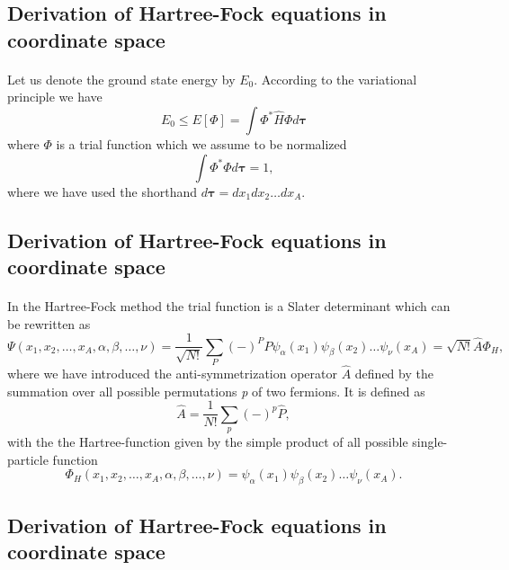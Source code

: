 \documentclass[%
twoside,                 %
final,                   %
10pt]{article}
\begin{document}
\subsection{Derivation of Hartree-Fock equations in coordinate space}

\paragraph{}
Let us denote the ground state energy by $E_0$. According to the
variational principle we have
\[
  E_0 \le E[\Phi] = \int \Phi^*\hat{H}\Phi d\mathbf{\tau}
\]
where $\Phi$ is a trial function which we assume to be normalized
\[
  \int \Phi^*\Phi d\mathbf{\tau} = 1,
\]
where we have used the shorthand $d\mathbf{\tau}=dx_1dx_2\dots dx_A$.



\subsection{Derivation of Hartree-Fock equations in coordinate space}

\paragraph{}
In the Hartree-Fock method the trial function is a Slater
determinant which can be rewritten as 
\[
  \Psi(x_1,x_2,\dots,x_A,\alpha,\beta,\dots,\nu) = \frac{1}{\sqrt{N!}}\sum_{P} (-)^PP\psi_{\alpha}(x_1)
    \psi_{\beta}(x_2)\dots\psi_{\nu}(x_A)=\sqrt{N!}\hat{A}\Phi_H,
\]
where we have introduced the anti-symmetrization operator $\hat{A}$ defined by the 
summation over all possible permutations \emph{p} of two fermions.
It is defined as
\[
  \hat{A} = \frac{1}{N!}\sum_{p} (-)^p\hat{P},
\]
with the the Hartree-function given by the simple product of all possible single-particle function
\[
  \Phi_H(x_1,x_2,\dots,x_A,\alpha,\beta,\dots,\nu) =
  \psi_{\alpha}(x_1)
    \psi_{\beta}(x_2)\dots\psi_{\nu}(x_A).
\]






\subsection{Derivation of Hartree-Fock equations in coordinate space}

\end{document}

